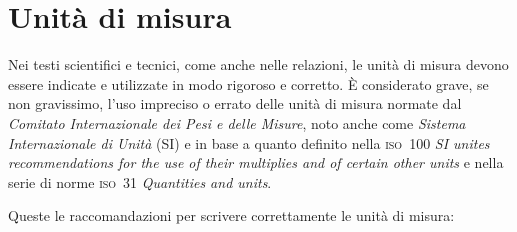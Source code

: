 					\section{Unità di misura}

Nei testi scientifici e tecnici, come anche nelle relazioni, le unità di misura devono essere indicate e utilizzate in modo rigoroso e corretto. È considerato grave, se non gravissimo, l'uso impreciso o errato delle unità di misura normate dal \textit{Comitato Internazionale dei Pesi e delle Misure}, noto anche come \textit{Sistema Internazionale di Unità} (SI) e in base a quanto definito nella \textsc{iso~100} \textit{SI unites recommendations for the use of their multiplies and of certain other units} e nella serie di norme \textsc{iso~31} \textit{Quantities and units}.

Queste le raccomandazioni per scrivere correttamente le unità di misura:
